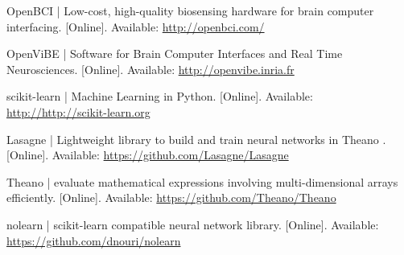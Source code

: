 \documentclass[landscape,final,a1paper,fontscale=0.4]{../baposter/baposter}
\begin{document}
\begin{poster}
{\begin{thebibliography}{1}
  	\setlength{\baselineskip}{0.4em}
  	 OpenBCI | Low-cost, high-quality biosensing hardware for brain computer interfacing. [Online]. Available: 
  	\url{http://openbci.com/}
  	
        	\setlength{\baselineskip}{0.4em}
        	 OpenViBE | Software for Brain Computer Interfaces and Real Time Neurosciences. [Online]. Available:\newline
	\url{http://openvibe.inria.fr}

	\setlength{\baselineskip}{0.4em}
        	 scikit-learn | Machine Learning in Python. [Online]. Available: 
	\url{http://http://scikit-learn.org}
      

	\setlength{\baselineskip}{0.4em}
        	Lasagne | Lightweight library to build and train neural networks in Theano . [Online]. Available:\newline
	\url{https://github.com/Lasagne/Lasagne}
      

	\setlength{\baselineskip}{0.4em}
        	 Theano | evaluate mathematical expressions involving multi-dimensional arrays efficiently. [Online]. Available:\newline
	\url{https://github.com/Theano/Theano}
	
	\setlength{\baselineskip}{0.4em}
	 nolearn | scikit-learn compatible neural network library. [Online]. Available: 
	\url{https://github.com/dnouri/nolearn}
      
      
  
   \end{thebibliography}
   
}
    
    
  
    

\end{poster}
\end{document}

